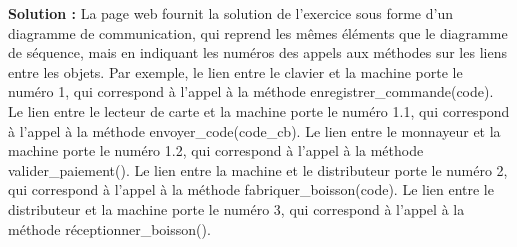 \documentclass{article}
\begin{document}
\textbf{Solution :} La page web fournit la solution de l’exercice sous forme d’un diagramme de communication, qui reprend les mêmes éléments que le diagramme de séquence, mais en indiquant les numéros des appels aux méthodes sur les liens entre les objets. Par exemple, le lien entre le clavier et la machine porte le numéro 1, qui correspond à l’appel à la méthode enregistrer_commande(code). Le lien entre le lecteur de carte et la machine porte le numéro 1.1, qui correspond à l’appel à la méthode envoyer_code(code_cb). Le lien entre le monnayeur et la machine porte le numéro 1.2, qui correspond à l’appel à la méthode valider_paiement(). Le lien entre la machine et le distributeur porte le numéro 2, qui correspond à l’appel à la méthode fabriquer_boisson(code). Le lien entre le distributeur et la machine porte le numéro 3, qui correspond à l’appel à la méthode réceptionner_boisson().
\end{document}

